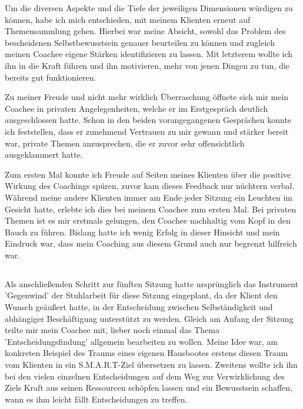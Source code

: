 \documentclass[11pt,a4paper]{article}
\begin{document}
Um die diversen Aspekte und die Tiefe der jeweiligen Dimensionen würdigen zu können, habe ich mich entschieden, mit meinem Klienten erneut auf Themensammlung gehen. Hierbei war meine Absicht, sowohl das Problem des bescheidenen Selbstbewusstsein genauer beurteilen zu können und zugleich meinen Coachee eigene Stärken identifizieren zu lassen. Mit letzterem wollte ich ihn in die Kraft führen und ihn motivieren, mehr von jenen Dingen zu tun, die bereits gut funktionieren. 

Zu meiner Freude und nicht mehr wirklich Überraschung öffnete sich mir mein Coachee in privaten Angelegenheiten, welche er im Erstgespräch deutlich ausgeschlossen hatte. Schon in den beiden vorangegangenen Gesprächen konnte ich feststellen, dass er zunehmend Vertrauen zu mir gewann und stärker bereit war, private Themen anzusprechen, die er zuvor sehr offensichtlich ausgeklammert hatte.


Zum ersten Mal konnte ich Freude auf Seiten meines Klienten über die positive Wirkung des Coachings spüren, zuvor kam dieses Feedback nur nüchtern verbal. Während meine andere Klienten immer am Ende jeder Sitzung ein Leuchten im Gesicht hatte, erlebte ich dies bei meinem Coachee zum ersten Mal. Bei privaten Themen ist es mir erstmals gelungen, den Coachee nachhaltig vom Kopf in den Bauch zu führen. Bislang hatte ich wenig Erfolg in dieser Hinsicht und mein Eindruck war, dass mein Coaching aus diesem Grund auch nur begrenzt hilfreich war.


\subsection*{\color{Orange}{Sechste Sitzung: Abschlusssitzung}}

Als anschließenden Schritt zur fünften Sitzung hatte ursprünglich das Instrument 'Gegenwind' der Stuhlarbeit für diese Sitzung eingeplant, da der Klient den Wunsch geäußert hatte, in der Entscheidung zwischen Selbständigkeit und abhängiger Beschäftigung unterstützt zu werden. Gleich am Anfang der Sitzung teilte mir mein Coachee mit, lieber noch einmal das Thema 'Entscheidungsfindung' allgemein bearbeiten zu wollen. Meine Idee war, am konkreten Beispiel des Traums eines eigenen Hausbootes erstens diesen Traum vom Klienten in ein S.M.A.R.T-Ziel übersetzen zu lassen. Zweitens wollte ich ihn bei den vielen einzelnen Entscheidungen auf dem Weg zur Verwirklichung des Ziels Kraft aus seinen Ressourcen schöpfen lassen und ein Bewusstsein schaffen, wann es ihm leicht fällt Entscheidungen zu treffen. 
\end{document}
